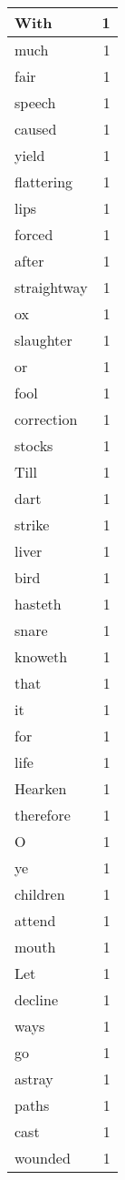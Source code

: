 \begin{center}
\begin{longtable}{l|r}
With & 1\\ \hline 
much & 1\\ \hline 
fair & 1\\ \hline 
speech & 1\\ \hline 
caused & 1\\ \hline 
yield & 1\\ \hline 
flattering & 1\\ \hline 
lips & 1\\ \hline 
forced & 1\\ \hline 
after & 1\\ \hline 
straightway & 1\\ \hline 
ox & 1\\ \hline 
slaughter & 1\\ \hline 
or & 1\\ \hline 
fool & 1\\ \hline 
correction & 1\\ \hline 
stocks & 1\\ \hline 
Till & 1\\ \hline 
dart & 1\\ \hline 
strike & 1\\ \hline 
liver & 1\\ \hline 
bird & 1\\ \hline 
hasteth & 1\\ \hline 
snare & 1\\ \hline 
knoweth & 1\\ \hline 
that & 1\\ \hline 
it & 1\\ \hline 
for & 1\\ \hline 
life & 1\\ \hline 
Hearken & 1\\ \hline 
therefore & 1\\ \hline 
O & 1\\ \hline 
ye & 1\\ \hline 
children & 1\\ \hline 
attend & 1\\ \hline 
mouth & 1\\ \hline 
Let & 1\\ \hline 
decline & 1\\ \hline 
ways & 1\\ \hline 
go & 1\\ \hline 
astray & 1\\ \hline 
paths & 1\\ \hline 
cast & 1\\ \hline 
wounded & 1\\ \hline 

\end{longtable}
\end{center}
